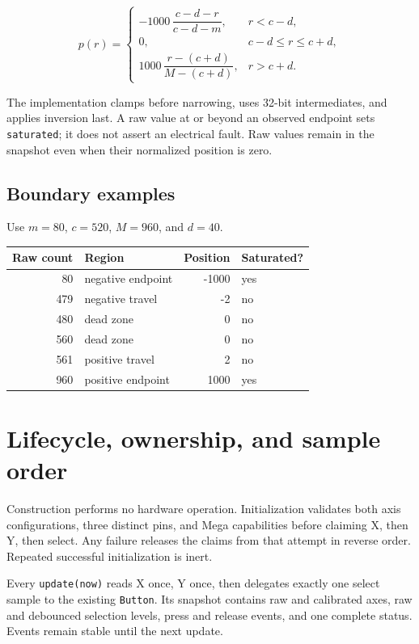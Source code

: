 \documentclass[11pt]{article}
\begin{document}
\begin{equation*}
p(r)=
\begin{cases}
-1000\,\dfrac{c-d-r}{c-d-m}, & r<c-d,\\[6pt]
0, & c-d\le r\le c+d,\\[6pt]
1000\,\dfrac{r-(c+d)}{M-(c+d)}, & r>c+d.
\end{cases}
\end{equation*}

The implementation clamps before narrowing, uses 32-bit intermediates, and
applies inversion last. A raw value at or beyond an observed endpoint sets
\texttt{saturated}; it does not assert an electrical fault. Raw values remain
in the snapshot even when their normalized position is zero.

\subsection{Boundary examples}

Use \(m=80\), \(c=520\), \(M=960\), and \(d=40\).

\begin{tabularx}{\linewidth}{@{}r X r l@{}}
\toprule
Raw count & Region & Position & Saturated?\\
\midrule
80  & negative endpoint & -1000 & yes\\
479 & negative travel & -2 & no\\
480 & dead zone & 0 & no\\
560 & dead zone & 0 & no\\
561 & positive travel & 2 & no\\
960 & positive endpoint & 1000 & yes\\
\bottomrule
\end{tabularx}

\section{Lifecycle, ownership, and sample order}

Construction performs no hardware operation. Initialization validates both
axis configurations, three distinct pins, and Mega capabilities before
claiming X, then Y, then select. Any failure releases the claims from that
attempt in reverse order. Repeated successful initialization is inert.

Every \texttt{update(now)} reads X once, Y once, then delegates exactly one
select sample to the existing \texttt{Button}. Its snapshot contains raw and
calibrated axes, raw and debounced selection levels, press and release events,
and one complete status. Events remain stable until the next update.
\end{document}
